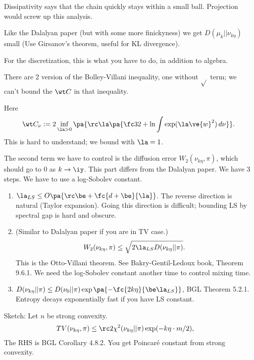 Dissipativity says that the chain quickly stays within a small ball. Projection would screw up this analysis.

Like the Dalalyan paper (but with some more finickyness) we get
$
D(\mu_k ||\nu_{k\eta})
$ small (Use Girsanov's theorem, useful for KL divergence).

For the discretization, this is what you have to do, in addition to algebra. 

There are 2 version of the Bolley-Villani inequality, one without $\sqrt{}$ term; we can't bound the $\wt C$ in that inequality. 

Here 
$$
\wt C_\nu :=2\inf_{\la>0} \pa{\rc \la \pa{\fc 32 + \ln \int \exp(\la\ve{w}^2)\,d\nu}}.
$$
This is hard to understand; we bound with $\la=1$.

The second term we have to control is the diffusion error $W_2(\nu_{k\eta}, \pi)$, which should go to 0 as $k\to \iy$. This part differs from the Dalalyan paper.
We have 3 steps. 
We have to use a log-Sobolev constant.
\begin{enumerate}
\item
$\la_{LS}\le O\pa{\rc \be + \fc{d+\be}{\la}}$.
The reverse direction is natural (Taylor expansion). 
Going this direction is difficult; bounding LS by spectral gap is hard and obscure. 
\item
(Similar to Dalalyan paper if you are in TV case.)
$$
W_2(\nu_{k\eta}, \pi)\le \sqrt{2 \la_{LS}D(\nu_{k\eta}||\pi)}.
$$
This is the Otto-Villani theorem. See Bakry-Gentil-Ledoux book, Theorem 9.6.1.
We need the log-Sobolev constant another time to control mixing time.
\item
$D(\nu_{k\eta}||\pi) \le D(\nu_0||\pi) \exp\pa{-\fc{2k\eta}{\be \la_{LS}}}$, BGL Theorem 5.2.1.
Entropy decays exponentially fast if you have LS constant. %
\end{enumerate}

Sketch: Let $n$ be strong convexity.
\begin{align}
TV(\nu_{k\eta}, \pi)
&\le 
\rc 2
\chi^2(\nu_{k\eta}||\pi) \exp(-k\eta\cdot m/2),
\end{align}
The RHS is BGL Corollary 4.8.2. 
You get Poincar\'e constant from strong convexity.

